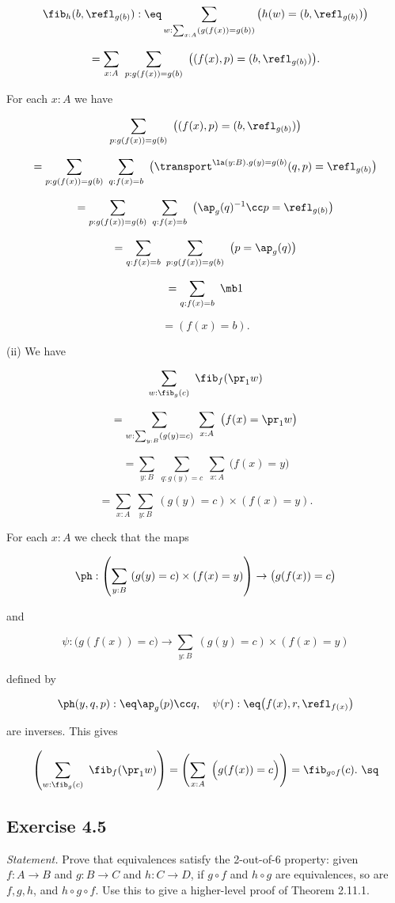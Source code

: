 \documentclass[12pt]{article}
\begin{document}
$$\fib_h(b,\refl_{g(b)}):\eq\sum_{w:\sum_{x:A}(g(f(x))=g(b))}\big(h(w)=(b,\refl_{g(b)})\big)$$ 

$$=\sum_{x:A}\ \sum_{p:g(f(x))=g(b)}\ \big((f(x),p)=(b,\refl_{g(b)})\big).$$ 

\nn For each $x:A$ we have

$$\sum_{p:g(f(x))=g(b)}\ \big((f(x),p)=(b,\refl_{g(b)})\big)$$ 

$$=\sum_{p:g(f(x))=g(b)}\ \sum_{q:f(x)=b}\ \big(\transport^{\la(y:B).g(y)=g(b)}(q,p)=\refl_{g(b)}\big)$$ 

$$=\sum_{p:g(f(x))=g(b)}\ \sum_{q:f(x)=b}\ \big(\ap_g(q)^{-1}\cc p=\refl_{g(b)}\big)$$ 

$$=\sum_{q:f(x)=b}\ \sum_{p:g(f(x))=g(b)}\ \big(p=\ap_g(q)\big)$$ 

$$=\sum_{q:f(x)=b}\ \mb1$$

$$=(f(x)=b).$$ 

\nn(ii) We have 

$$\sum_{w:\fib_g(c)}\ \fib_f(\pr_1w)$$ 

$$=\sum_{w:\sum_{y:B}(g(y)=c)}\ \sum_{x:A}\ \big(f(x)=\pr_1w\big)$$ 

$$=\sum_{y:B}\ \sum_{q:g(y)=c}\ \sum_{x:A}\ \big(f(x)=y\big)$$ 

$$=\sum_{x:A}\ \sum_{y:B}\ (g(y)=c)\times(f(x)=y).$$ 

\nn For each $x:A$ we check that the maps 

$$\ph:\left(\sum_{y:B}\ (g(y)=c)\times(f(x)=y)\right)\to\big(g(f(x))=c\big)$$ 

\nn and 

$$\psi:\big(g(f(x))=c\big)\to\sum_{y:B}\ (g(y)=c)\times(f(x)=y)$$ 

\nn defined by 

$$\ph(y,q,p):\eq\ap_g(p)\cc q,\quad\psi(r):\eq\big(f(x),r,\refl_{f(x)}\big)$$ 

\nn are inverses. This gives 

$$\left(\sum_{w:\fib_g(c)}\ \fib_f(\pr_1w)\right)=\left(\sum_{x:A}\ \Big(g(f(x))=c\Big)\right)=\fib_{g\circ f}(c).\ \sq$$


\subsection{Exercise 4.5}\label{45}

\emph{Statement.} Prove that equivalences satisfy the 2-out-of-6 property: given $f:A\to B$ and $g:B\to C$ and $h:C\to D$, if $g\circ f$ and $h\circ g$ are equivalences, so are $f,g,h$, and $h\circ g\circ f$. Use this to give a higher-level proof of Theorem 2.11.1.
\end{document}
